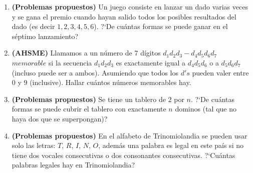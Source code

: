 \documentclass[10pt,a4 paper]{article}
\begin{document}
\begin{enumerate}
\item \textbf{(Problemas propuestos)} Un juego consiste en lanzar un dado varias veces y se gana el premio cuando hayan salido todos los posibles resultados del dado (es decir $1, 2, 3, 4, 5, 6$). ?`De cu\'antas formas se puede ganar en el s\'eptimo lanzamiento?

\item \textbf{(AHSME)} Llamamos a un n\'umero de 7 d\'igitos $d_{1}d_{2}d_{3}-d_{4}d_{5}d_{6}d_{7}$ $memorable$ si la secuencia $d_{1}d_{2}d_{3}$ es exactamente igual a $d_{4}d_{5}d_{6}$ o a $d_{5}d_{6}d_{7}$ (incluso puede ser a ambos). Asumiendo que todos los $d's$ pueden valer entre $0$ y $9$ (inclusive). Hallar cu\'antos n\'umeros memorables hay.


\item \textbf{(Problemas propuestos)} Se tiene un tablero de $2$ por $n$. ?`De cu\'antas formas se puede cubrir el tablero con exactamente $n$ dominos (tal que no haya dos que se superpongan)? 


\item \textbf{(Problemas propuestos)} En el alfabeto de Trinomiolandia se pueden usar solo las letras: $T$, $R$, $I$, $N$, $O$, adem\'as una palabra es legal en este pa\'is si no tiene dos vocales consecutivas o dos consonantes consecutivas. ?`Cu\'antas palabras legales hay en Trinomiolandia?





\end{enumerate}
\end{document}
